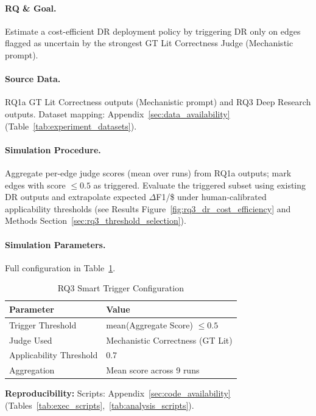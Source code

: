 \paragraph{RQ \& Goal.}
Estimate a cost-efficient DR deployment policy by triggering DR only on edges flagged as uncertain by the strongest GT Lit Correctness Judge (Mechanistic prompt).

\paragraph{Source Data.}
RQ1a GT Lit Correctness outputs (Mechanistic prompt) and RQ3 Deep Research outputs. Dataset mapping: Appendix~\ref{sec:data_availability} (Table~\ref{tab:experiment_datasets}).

\paragraph{Simulation Procedure.}
Aggregate per-edge judge scores (mean over runs) from RQ1a outputs; mark edges with score $\leq 0.5$ as triggered. Evaluate the triggered subset using existing DR outputs and extrapolate expected $\Delta$F1/\$ under human-calibrated applicability thresholds (see Results Figure~\ref{fig:rq3_dr_cost_efficiency} and Methods Section~\ref{sec:rq3_threshold_selection}).

\paragraph{Simulation Parameters.}
Full configuration in Table~\ref{tab:rq3_smart_trigger_config}.

\begin{table}[H]
\centering
\caption{RQ3 Smart Trigger Configuration}
\label{tab:rq3_smart_trigger_config}
\footnotesize
\begin{tabular}{@{}ll@{}}
\toprule
\textbf{Parameter} & \textbf{Value} \\
\midrule
Trigger Threshold & mean(Aggregate Score) $\leq 0.5$ \\
Judge Used & Mechanistic Correctness (GT Lit) \\
Applicability Threshold & 0.7 \\
Aggregation & Mean score across 9 runs \\
\bottomrule
\end{tabular}
\end{table}

\textbf{Reproducibility:} Scripts: Appendix~\ref{sec:code_availability} (Tables~\ref{tab:exec_scripts},~\ref{tab:analysis_scripts}).

\endgroup
